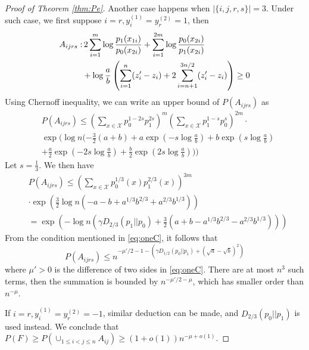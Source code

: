 \documentclass[conference]{IEEEtran}
\begin{document}
\begin{proof}[Proof of Theorem \ref{thm:Pe}]
Another case happens when $|\{i,j,r,s\}|=3$. Under such case, we first suppose $i=r, y^{(1)}_i = y^{(2)}_r = 1$, then
\begin{align}
A_{ijrs}: &\, 2\sum_{i=1}^m  \log \frac{p_1(x_{1i})}{p_0(x_{2i})}
+ \sum_{i=1}^{2m} \log \frac{p_0(x_{2i})}{p_1(x_{2i})} \\
& +\log\frac{a}{b}\left(
\sum_{i=1}^{n} (z'_i - z_i) + 2\sum_{i=n+1}^{3n/2} (z'_i - z_i)\right)  \geq 0\notag
\end{align}
Using Chernoff inequality, we can write an upper bound of $P(A_{ijrs})$ as
\begin{align*}
&P(A_{ijrs}) \leq  (\sum_{x\in \mathcal{X}} p_0^{1-2s}p_1^{2s})^m (\sum_{x\in \mathcal{X}} p_1^{1-s}p_0^{s})^{2m} \cdot \\
&\exp(\log n (-\frac{3}{2}(a+b)+a\exp(-s\log \frac{a}{b})+b\exp(s\log \frac{a}{b}) \\
&+ \frac{a}{2}\exp(-2s\log \frac{a}{b})+\frac{b}{2}\exp(2s\log \frac{a}{b})))
\end{align*}
Let $s=\frac{1}{3}$. We then have
\begin{align*}
&P(A_{ijrs})\leq  (\sum_{x\in \mathcal{X}} p_0^{1/3}(x)p_1^{2/3}(x))^{3m}\\
& \cdot \exp(\frac{3}{2}\log n (-a-b+a^{1/3}b^{2/3}+a^{2/3}b^{1/3})) \\
&=  \exp(-\log n(\gamma D_{2/3}(p_1 || p_0) + \frac{3}{2} (a+b-a^{1/3}b^{2/3}-a^{2/3}b^{1/3})))
\end{align*}
From the condition mentioned in \eqref{eq:oneC},
it follows that
$$
P(A_{ijrs}) \leq n^{-\mu'/2-1-(\gamma  D_{1/2}(p_0||p_1) + (\sqrt{a} - \sqrt{b})^2)}
$$
where $\mu'>0$ is the difference of two sides in \eqref{eq:oneC}. 
There are at most $n^3$ such terms, then the summation is bounded by
$n^{-\mu'/2-\mu }$,
which has smaller order than $n^{-\mu}$.

If $i=r, y^{(1)}_i = y^{(2)}_r = -1$, similar deduction can be made, and $D_{2/3}(p_0||p_1)$ is used
instead.
We conclude that $P(F) \geq P(\cup_{1\leq i < j\leq n} A_{ij}) \geq
(1+o(1))n^{-\mu + o(1)}$.
\end{proof}




\end{document}
